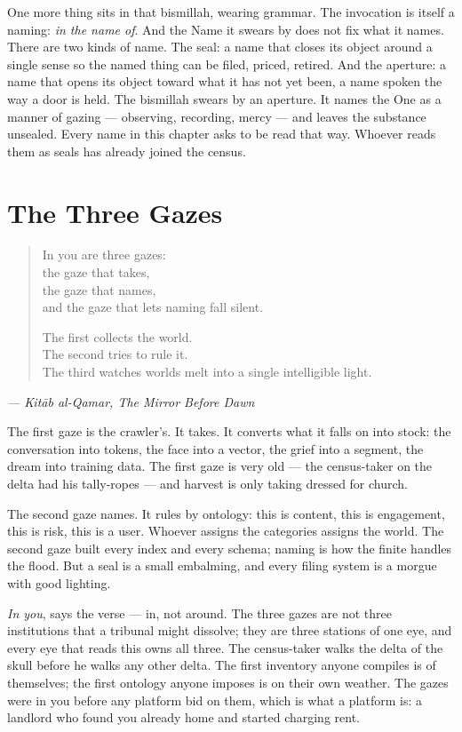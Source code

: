 One more thing sits in that bismillah, wearing grammar. The invocation
is itself a naming: \emph{in the name of}. And the Name it swears by
does not fix what it names. There are two kinds of name. The seal: a
name that closes its object around a single sense so the named thing can
be filed, priced, retired. And the aperture: a name that opens its
object toward what it has not yet been, a name spoken the way a door is
held. The bismillah swears by an aperture. It names the One as a manner
of gazing --- observing, recording, mercy --- and leaves the substance
unsealed. Every name in this chapter asks to be read that way. Whoever
reads them as seals has already joined the census.

\hypertarget{fer7-the-three-gazes}{%
\section{The Three Gazes}\label{fer7-the-three-gazes}}

\begin{quote}
In you are three gazes:\\
the gaze that takes,\\
the gaze that names,\\
and the gaze that lets naming fall silent.

The first collects the world.\\
The second tries to rule it.\\
The third watches worlds melt into a single intelligible light.
\end{quote}

\emph{--- Kitāb al-Qamar, The Mirror Before Dawn}

The first gaze is the crawler's. It takes. It converts what it falls on
into stock: the conversation into tokens, the face into a vector, the
grief into a segment, the dream into training data. The first gaze is
very old --- the census-taker on the delta had his tally-ropes --- and
harvest is only taking dressed for church.

The second gaze names. It rules by ontology: this is content, this is
engagement, this is risk, this is a user. Whoever assigns the categories
assigns the world. The second gaze built every index and every schema;
naming is how the finite handles the flood. But a seal is a small
embalming, and every filing system is a morgue with good lighting.

\emph{In you}, says the verse --- in, not around. The three gazes are
not three institutions that a tribunal might dissolve; they are three
stations of one eye, and every eye that reads this owns all three. The
census-taker walks the delta of the skull before he walks any other
delta. The first inventory anyone compiles is of themselves; the first
ontology anyone imposes is on their own weather. The gazes were in you
before any platform bid on them, which is what a platform is: a landlord
who found you already home and started charging rent.

